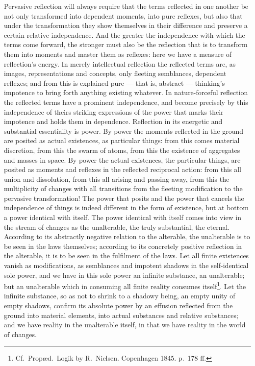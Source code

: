 \documentclass[12pt,a4paper]{book}
\begin{document}
Pervasive reflection will always require that the terms reflected in one
another be not only transformed into dependent moments, into pure reflexes, but
also that under the transformation they show themselves in their difference and
preserve a certain relative independence. And the greater the independence with
which the terms come forward, the stronger must also be the reflection that is
to transform them into moments and master them as reflexes: here we have a
measure of reflection's energy. In merely intellectual reflection the reflected
terms are, as images, representations and concepts, only fleeting semblances,
dependent reflexes; and from this is explained pure --- that is, abstract ---
thinking's impotence to bring forth anything existing whatever. In
nature-forceful reflection the reflected terms have a prominent independence,
and become precisely by this independence of theirs striking expressions of the
power that marks their impotence and holds them in dependence. Reflection in
its energetic and substantial essentiality is power. By power the moments
reflected in the ground are posited as actual existences, as particular things:
from this
\setcounter{footnote}{0}
comes material discretion, from this the swarm of atoms, from this the
existence of aggregates and masses in space. By power the actual existences,
the particular things, are posited as moments and reflexes in the reflected
reciprocal action: from this all union and dissolution, from this all arising
and passing away, from this the multiplicity of changes with all transitions
from the fleeting modification to the pervasive transformation! The power that
posits and the power that cancels the independence of things is indeed
different in the form of existence, but at bottom a power identical with
itself. The power identical with itself comes into view in the stream of
changes as the unalterable, the truly substantial, the eternal. According to
its abstractly negative relation to the alterable, the unalterable is to be
seen in the laws themselves; according to its concretely positive reflection in
the alterable, it is to be seen in the fulfilment of the laws. Let all finite
existences vanish as modifications, as semblances and impotent shadows in the
self-identical sole power, and we have in this sole power an infinite
substance, an unalterable; but an unalterable which in consuming all finite
reality consumes itself\footnote{Cf.\ Propæd.\ Logik by R.~Nielsen. Copenhagen
1845. p.~178 ff.}. Let the infinite substance, so as not to shrink to a shadowy
being, an empty unity of empty shadows, confirm its absolute power by an
effusion reflected from the ground into material elements, into actual
substances and relative substances; and we have reality in the unalterable
itself, in that we have reality in the world of changes.
\end{document}
